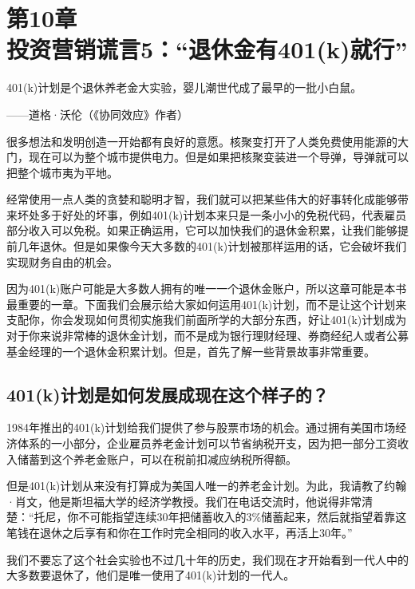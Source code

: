 
\section[第10章\q 投资营销谎言5：“退休金有401(k)就行”]{第10章\\ 投资营销谎言5：“退休金有401(k)就行”}

\begin{BookQuote}
401(k)计划是个退休养老金大实验，婴儿潮世代成了最早的一批小白鼠。

\hfill ——道格·沃伦（《协同效应》作者）
\end{BookQuote}

很多想法和发明创造一开始都有良好的意愿。核聚变打开了人类免费使用能源的大门，现在可以为整个城市提供电力。但是如果把核聚变装进一个导弹，导弹就可以把整个城市夷为平地。

经常使用一点人类的贪婪和聪明才智，我们就可以把某些伟大的好事转化成能够带来坏处多于好处的坏事，例如401(k)计划本来只是一条小小的免税代码，代表雇员部分收入可以免税。如果正确运用，它可以加快我们的退休金积累，让我们能够提前几年退休。但是如果像今天大多数的401(k)计划被那样运用的话，它会破坏我们实现财务自由的机会。

因为401(k)账户可能是大多数人拥有的唯一一个退休金账户，所以这章可能是本书最重要的一章。下面我们会展示给大家如何运用401(k)计划，而不是让这个计划来支配你，你会发现如何贯彻实施我们前面所学的大部分东西，好让401(k)计划成为对于你来说非常棒的退休金计划，而不是成为银行理财经理、券商经纪人或者公募基金经理的一个退休金积累计划。但是，首先了解一些背景故事非常重要。

\subsection{401(k)计划是如何发展成现在这个样子的？}

1984年推出的401(k)计划给我们提供了参与股票市场的机会。通过拥有美国市场经济体系的一小部分，企业雇员养老金计划可以节省纳税开支，因为把一部分工资收入储蓄到这个养老金账户，可以在税前扣减应纳税所得额。

但是401(k)计划从来没有打算成为美国人唯一的养老金计划。为此，我请教了约翰·肖文，他是斯坦福大学的经济学教授。我们在电话交流时，他说得非常清楚：“托尼，你不可能指望连续30年把储蓄收入的3\%储蓄起来，然后就指望着靠这笔钱在退休之后享有和你在工作时完全相同的收入水平，再活上30年。”

我们不要忘了这个社会实验也不过几十年的历史，我们现在才开始看到一代人中的大多数要退休了，他们是唯一使用了401(k)计划的一代人。

